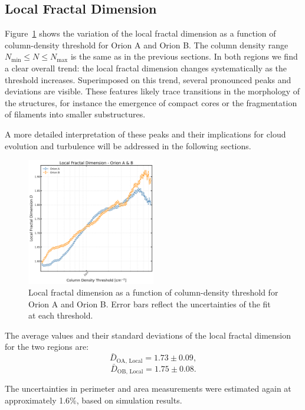 \subsection{Local Fractal Dimension}

Figure~\ref{fig:local_Orion_A_B} shows the variation of the local fractal dimension as a function of column-density threshold for Orion A and Orion B. The column density range  \(N_\mathrm{min} \leq N \leq N_\mathrm{max}\) is the same as in the previous sections. In both regions we find a clear overall trend: the local fractal dimension changes systematically as the threshold increases. Superimposed on this trend, several pronounced peaks and deviations are visible. These features likely trace transitions in the morphology of the structures, for instance the emergence of compact cores or the fragmentation of filaments into smaller substructures.

A more detailed interpretation of these peaks and their implications for cloud evolution and turbulence will be addressed in the following sections.

\begin{figure}[t]
    \centering
    \includegraphics[width=0.5\textwidth]{figures/local_orion_A_B.png}
    \caption{Local fractal dimension as a function of column-density threshold for Orion A and Orion B. Error bars reflect the uncertainties of the fit at each threshold.}
    \label{fig:local_Orion_A_B}
\end{figure}

The average values and their standard deviations of the local fractal dimension for the two regions are:
\[
\bar{D}_{\mathrm{OA,\,Local}} = 1.73 \pm 0.09,
\]
\[
\bar{D}_{\mathrm{OB,\,Local}} = 1.75 \pm 0.08.
\]

The uncertainties in perimeter and area measurements were estimated again at approximately 1.6\%, based on simulation results.

